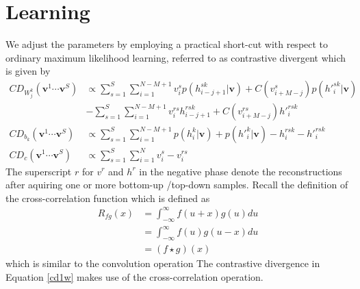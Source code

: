 \documentclass[12pt]{article}
\begin{document}
\section{Learning}
We adjust the parameters by employing a practical
short-cut with respect to ordinary maximum likelihood learning,
referred to as contrastive divergent which is given by
\begin{align}
	CD_{W_j^k}(\mathbf{v}^1\cdots\mathbf{v}^S) &\propto 
	\sum_{s=1}^S \sum_{i=1}^{N-M+1} v_{i}^s p(h_{i-j+1}^{sk}|\mathbf{v})+
	 C(v_{i+M-j}^s) p({h'}_{i}^{sk}|\mathbf{v})\nonumber\\
	 &- \sum_{s=1}^S \sum_{i=1}^{N-M+1}v_{i}^{rs} h_{i-j+1}^{rsk}
	 +C(v_{i+M-j}^{rs}) {h'}_{i}^{rsk}\label{cd1w}\\
	CD_{b_k}(\mathbf{v}^1\cdots\mathbf{v}^S) &\propto 
	\sum_{s=1}^S \sum_{i=1}^{N-M+1} p(h_{i}^{k}|\mathbf{v})+
	p({h'}_{i}^{k}|\mathbf{v})
	- h_{i}^{rsk}
	- {h'}_{i}^{rsk}\label{cd1b}\\
	CD_{c}(\mathbf{v}^1\cdots\mathbf{v}^S) &\propto 
	\sum_{s=1}^S \sum_{i=1}^{N} v_{i}^s 
	- v_{i}^{rs}
\end{align}
The superscript $r$ for $v^r$ and $h^r$ in the negative phase denote the
reconstructions after aquiring one or more bottom-up /top-down samples.
Recall the definition of the cross-correlation function which is defined as
\begin{align}
 R_{fg}(x)&=\int_{-\infty}^\infty f(u+x)g(u)du\\
 &=\int_{-\infty}^\infty f(u)g(u-x)du\\
 &=(f\star g)(x)
\end{align}
which is similar to the convolution operation
The contrastive divergence in Equation \ref{cd1w} makes 
use of the cross-correlation operation.
\end{document}
